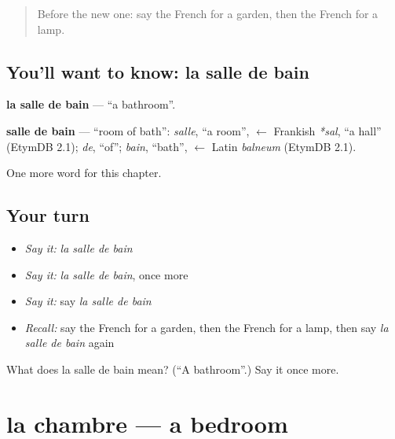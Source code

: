 \label{lesson:FR-C74-bain}



\begin{quote}
Before the new one: say the French for a garden, then the French for a lamp.
\end{quote}

\subsection*{You'll want to know: la salle de bain}
\textbf{la salle de bain} — \textquotedblleft{}a bathroom\textquotedblright{}.

\begin{cousinweb}
\textbf{salle de bain} — \textquotedblleft{}room of bath\textquotedblright{}: \emph{salle}, \textquotedblleft{}a room\textquotedblright{}, $\leftarrow$ Frankish \emph{*sal}, \textquotedblleft{}a hall\textquotedblright{} (EtymDB 2.1); \emph{de}, \textquotedblleft{}of\textquotedblright{}; \emph{bain}, \textquotedblleft{}bath\textquotedblright{}, $\leftarrow$ Latin \emph{balneum} (EtymDB 2.1).
\end{cousinweb}

\begin{grammarlens}[title={What you've built}]
One more word for this chapter.
\end{grammarlens}

\subsection*{Your turn}
\begin{itemize}
\raggedright
  \item \emph{Say it:} \emph{la salle de bain}
  \item \emph{Say it:} \emph{la salle de bain}, once more
  \item \emph{Say it:} say \emph{la salle de bain}
  \item \emph{Recall:} say the French for a garden, then the French for a lamp, then say \emph{la salle de bain} again
\end{itemize}

\begin{tcolorbox}[breakable,colback=teal!4,colframe=teal!35!black,title={Before you move on}]
What does la salle de bain mean? (\textquotedblleft{}A bathroom\textquotedblright{}.) Say it once more.
\end{tcolorbox}
\section[la chambre]{la chambre — a bedroom}

